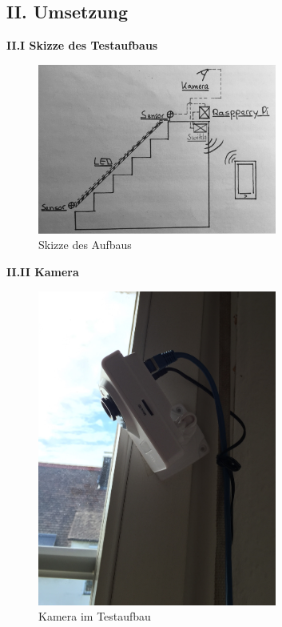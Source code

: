 \pagebreak
\subsection*{II. Umsetzung}
\textbf{II.I Skizze des Testaufbaus}\\
\begin{figure}[h]
	\begin{minipage}{0.7\textwidth}
		\centering
		\includegraphics[width=0.7\textwidth]{./data/praxis0.jpg}
		\caption{Skizze des Aufbaus}
	\end{minipage}
\end{figure}

\textbf{II.II Kamera}\\
\begin{figure}[h]
	\begin{minipage}{0.7\textwidth}
		\centering
		\includegraphics[width=0.7\textwidth]{./data/praxis2.jpg}
		\caption{Kamera im Testaufbau}
	\end{minipage}
\end{figure}
\clearpage
\pagebreak

